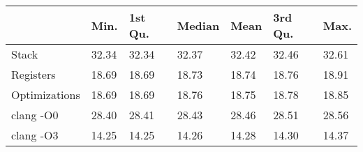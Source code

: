 \begin{table}[ht]
\centering
\begin{tabular}{p{}p{}p{}p{}p{}p{}p{}}
  \hline
 & Min. & 1st Qu. & Median & Mean & 3rd Qu. & Max. \\ 
  \hline
Stack & 32.34 & 32.34 & 32.37 & 32.42 & 32.46 & 32.61 \\ 
  Registers & 18.69 & 18.69 & 18.73 & 18.74 & 18.76 & 18.91 \\ 
  Optimizations & 18.69 & 18.69 & 18.76 & 18.75 & 18.78 & 18.85 \\ 
  clang -O0 & 28.40 & 28.41 & 28.43 & 28.46 & 28.51 & 28.56 \\ 
  clang -O3 & 14.25 & 14.25 & 14.26 & 14.28 & 14.30 & 14.37 \\ 
   \hline
\end{tabular}
\end{table}
